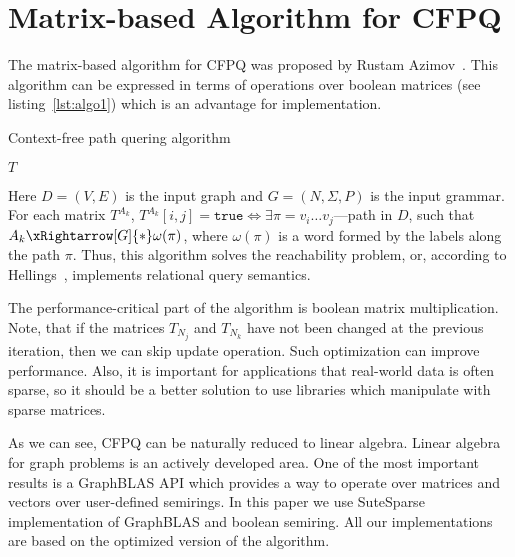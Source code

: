 \section{Matrix-based Algorithm for CFPQ}

The matrix-based algorithm for CFPQ was proposed by Rustam Azimov~\cite{Azimov:2018:CPQ:3210259.3210264}.
This algorithm can be expressed in terms of operations over boolean matrices (see listing~\ref{lst:algo1}) which is an advantage for implementation.

\begin{algorithm}
\begin{algorithmic}[1]
\caption{Context-free path quering algorithm}
\label{lst:algo1}

        \EndFor
    \EndFor
    \EndFor

        \EndFor
    \EndWhile
\State \Return $T$
\EndFunction
\end{algorithmic}
\end{algorithm}

Here $D = (V, E)$ is the input graph and $G = (N,\Sigma,P)$ is the input grammar.
For each matrix $T^{A_k}$, $T^{A_k}[i,j] = \texttt{true} \iff \exists \pi = v_i \ldots v_j $---path in $D$, such that $A_k \xRightarrow[G]{*} \omega(\pi) $, where $\omega(\pi)$ is a word formed by the labels along the path $\pi$.
Thus, this algorithm solves the reachability problem, or, according to Hellings~\cite{hellingsRelational}, implements relational query semantics.

The performance-critical part of the algorithm is boolean matrix multiplication.
Note, that if the matrices $T_{N_j}$ and $T_{N_k}$ have not been changed at the previous iteration, then we can skip update operation.
Such optimization can improve performance.
Also, it is important for applications that real-world data is often sparse, so it should be a better solution to use libraries which manipulate with sparse matrices.

As we can see, CFPQ can be naturally reduced to linear algebra.
Linear algebra for graph problems is an actively developed area.
One of the most important results is a GraphBLAS API which provides a way to operate over matrices and vectors over user-defined semirings.
In this paper we use SuteSparse implementation of GraphBLAS and boolean semiring.
All our implementations are based on the optimized version of the algorithm.
